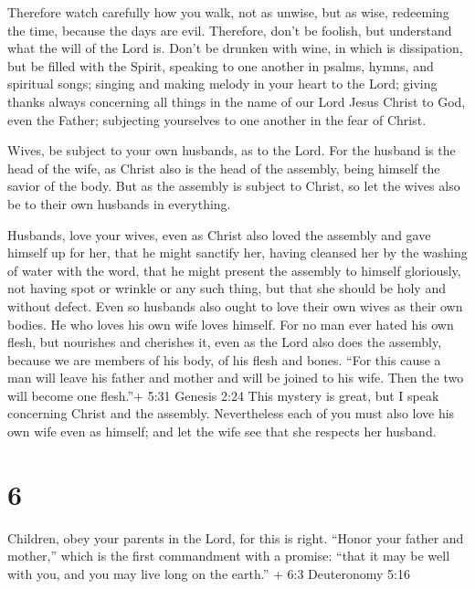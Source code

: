 Therefore watch carefully how you walk, not as unwise, but
as wise,  redeeming the time, because the days are evil.
 Therefore, don't be foolish, but understand what the will
of the Lord is.  Don't be drunken with wine, in which is
dissipation, but be filled with the Spirit,  speaking to
one another in psalms, hymns, and spiritual songs; singing and making
melody in your heart to the Lord;  giving thanks always
concerning all things in the name of our Lord Jesus Christ to God, even
the Father;  subjecting yourselves to one another in the
fear of Christ.

 Wives, be subject to your own husbands, as to the Lord.
 For the husband is the head of the wife, as Christ also is
the head of the assembly, being himself the savior of the body.
 But as the assembly is subject to Christ, so let the wives
also be to their own husbands in everything.

 Husbands, love your wives, even as Christ also loved the
assembly and gave himself up for her,  that he might
sanctify her, having cleansed her by the washing of water with the word,
 that he might present the assembly to himself gloriously,
not having spot or wrinkle or any such thing, but that she should be
holy and without defect.  Even so husbands also ought to
love their own wives as their own bodies. He who loves his own wife
loves himself.  For no man ever hated his own flesh, but
nourishes and cherishes it, even as the Lord also does the assembly,
 because we are members of his body, of his flesh and
bones.  ``For this cause a man will leave his father and
mother and will be joined to his wife. Then the two will become one
flesh.''+ 5:31 Genesis 2:24  This mystery is great, but I
speak concerning Christ and the assembly.  Nevertheless
each of you must also love his own wife even as himself; and let the
wife see that she respects her husband.

\hypertarget{section-5}{%
\section{6}\label{section-5}}

 Children, obey your parents in the Lord, for this is right.
 ``Honor your father and mother,'' which is the first
commandment with a promise:  ``that it may be well with you,
and you may live long on the earth.'' + 6:3 Deuteronomy 5:16

